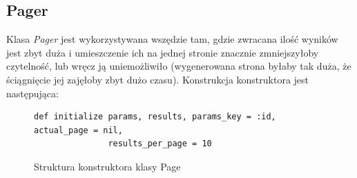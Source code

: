 \documentclass[a4paper,12pt,oneside]{report}
\begin{document}
\subsection{Pager}
\label{sub:pager}
Klasa \emph{Pager} jest wykorzystywana wszędzie tam, gdzie zwracana ilość wyników jest zbyt duża i umieszczenie ich na jednej stronie znacznie zmniejszyłoby czytelność, lub wręcz ją uniemożliwiło (wygenerowana strona byłaby tak duża, że ściągnięcie jej zajęłoby zbyt dużo czasu). Konstrukcja konstruktora jest następująca:

\begin{figure}[h]
\begin{verbatim}def initialize params, results, params_key = :id, actual_page = nil,
               results_per_page = 10\end{verbatim}
\caption{Struktura konstruktora klasy Page\label{fig:page}}
\end{figure}
\end{document}
